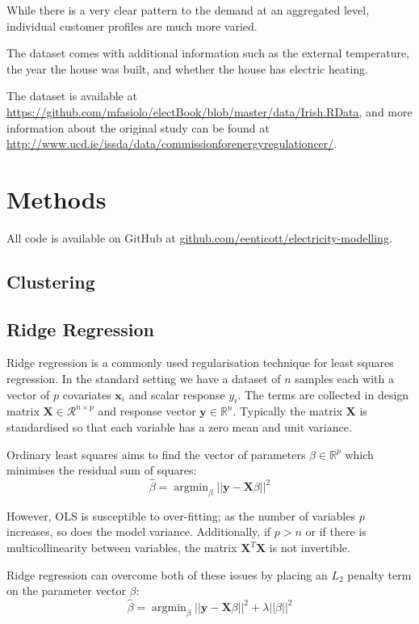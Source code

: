 \documentclass[11pt,a4paper]{article}
\DeclareMathOperator*{\argmin}{argmin}
\begin{document}
While there is a very clear pattern to the demand at an aggregated level, individual customer profiles are much more varied.

The dataset comes with additional information such as the external temperature, the year the house was built, and whether the house has electric heating. 

The dataset is available at \url{https://github.com/mfasiolo/electBook/blob/master/data/Irish.RData}, and more information about the original study can be found at \url{http://www.ucd.ie/issda/data/commissionforenergyregulationcer/}.

\section{Methods} \label{methods}
All code is available on GitHub at \url{github.com/eenticott/electricity-modelling}.

\subsection{Clustering}

\subsection{Ridge Regression} 
Ridge regression is a commonly used regularisation technique for least squares regression. 
In the standard setting we have a dataset of $n$ samples each with a vector of $p$ covariates $\textbf{x}_i$ and scalar response $y_i$. 
The terms are collected in design matrix $\textbf{X} \in \mathcal{R}^{n \times p}$ and response vector $\textbf{y} \in \mathbb{R}^n$. Typically the matrix $\textbf{X}$ is standardised so that each variable has a zero mean and unit variance. 

Ordinary least squares aims to find the vector of parameters $\beta \in \mathbb{R}^p$ which minimises the residual sum of squares:
$$\hat{\beta} = \argmin_{\beta} || \textbf{y} - \textbf{X} \beta ||^2$$

However, OLS is susceptible to over-fitting; as the number of variables $p$ increases, so does the model variance. Additionally, if $p>n$ or if there is multicollinearity between variables, the matrix $\textbf{X}^T\textbf{X}$ is not invertible. 

Ridge regression can overcome both of these issues by placing an $L_2$ penalty term on the parameter vector $\beta$:
$$\hat{\beta} = \argmin_{\beta} || \textbf{y} - \textbf{X} \beta ||^2 + \lambda ||\beta||^2$$
\end{document}
